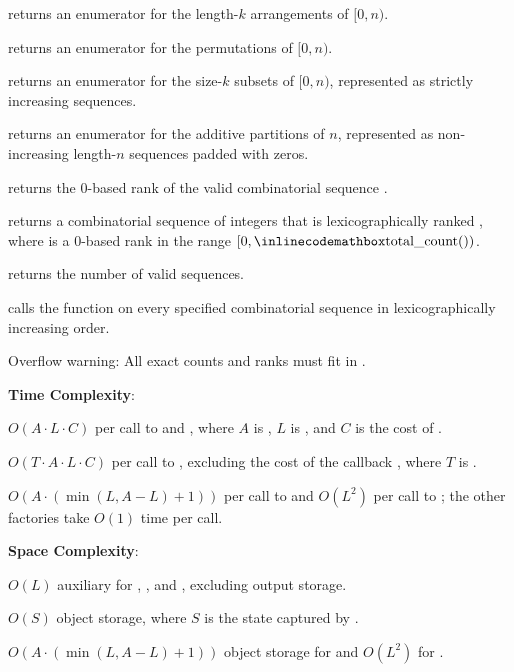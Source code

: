 \begin{compactitem}
  \item {} returns an enumerator for the length-$k$ arrangements of $[0, n)$.
  \item {} returns an enumerator for the permutations of $[0, n)$.
  \item {} returns an enumerator for the size-$k$ subsets of $[0, n)$, represented as strictly increasing sequences.
  \item {} returns an enumerator for the additive partitions of $n$, represented as non-increasing length-$n$ sequences padded with zeros.
  \item {} returns the 0-based rank of the valid combinatorial sequence .
  \item {} returns a combinatorial sequence of integers that is lexicographically ranked , where  is a 0-based rank in the range $[0, {\inlinecodemath{total\_count()}})$.
  \item {} returns the number of valid sequences.
  \item {} calls the function  on every specified combinatorial sequence  in lexicographically increasing order.
\end{compactitem}

Overflow warning: All exact counts and ranks must fit in .

\textbf{Time Complexity}:
\begin{compactitem}
  \item $O(A \cdot L \cdot C)$ per call to  and , where $A$ is , $L$ is , and $C$ is the cost of .
  \item $O(T \cdot A \cdot L \cdot C)$ per call to , excluding the cost of the callback , where $T$ is .
  \item $O(A \cdot (\min\left(L, A - L\right) + 1))$ per call to  and $O(L^{2})$ per call to ; the other factories take $O(1)$ time per call.
\end{compactitem}

\textbf{Space Complexity}:
\begin{compactitem}
  \item $O(L)$ auxiliary for , , and , excluding output storage.
  \item $O(S)$ object storage, where $S$ is the state captured by .
  \item $O(A \cdot (\min\left(L, A - L\right) + 1))$ object storage for  and $O(L^{2})$ for .
\end{compactitem}

